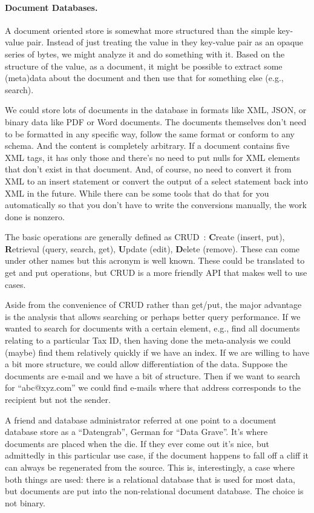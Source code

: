 \paragraph{Document Databases.} 

A document oriented store is somewhat more structured than the simple key-value pair. Instead of just treating the value in they key-value pair as an opaque series of bytes, we might analyze it and do something with it. Based on the structure of the value, as a document, it might be possible to extract some (meta)data about the document and then use that for something else (e.g., search). 

We could store lots of documents in the database in formats like XML, JSON, or binary data like PDF or Word documents. The documents themselves don't need to be formatted in any specific way, follow the same format or conform to any schema. And the content is completely arbitrary. If a document contains five XML tags, it has only those and there's no need to put nulls for XML elements that don't exist in that document. And, of course, no need to convert it from XML to an insert statement or convert the output of a select statement back into XML in the future. While there can be some tools that do that for you automatically so that you don't have to write the conversions manually, the work done is nonzero.

The basic operations are generally defined as CRUD~\cite{martin1983managing}: \textbf{C}reate (insert, put), \textbf{R}etrieval (query, search, get), \textbf{U}pdate (edit), \textbf{D}elete (remove). These can come under other names but this acronym is well known. These could be translated to get and put operations, but CRUD is a more friendly API that makes well to use cases.

Aside from the convenience of CRUD rather than get/put, the major advantage is the analysis that allows searching or perhaps better query performance. If we wanted to search for documents with a certain element, e.g., find all documents relating to a particular Tax ID, then having done the meta-analysis we could (maybe) find them relatively quickly if we have an index. If we are willing to have a bit more structure, we could allow differentiation of the data. Suppose the documents are e-mail and we have a bit of structure. Then if we want to search for ``abc@xyz.com'' we could find e-mails where that address corresponds to the recipient but not the sender.

A friend and database administrator referred at one point to a document database store as a ``Datengrab'', German for ``Data Grave''. It's where documents are placed when the die. If they ever come out it's nice, but admittedly in this particular use case, if the document happens to fall off a cliff it can always be regenerated from the source. This is, interestingly, a case where both things are used: there is a relational database that is used for most data, but documents are put into the non-relational document database. The choice is not binary.

